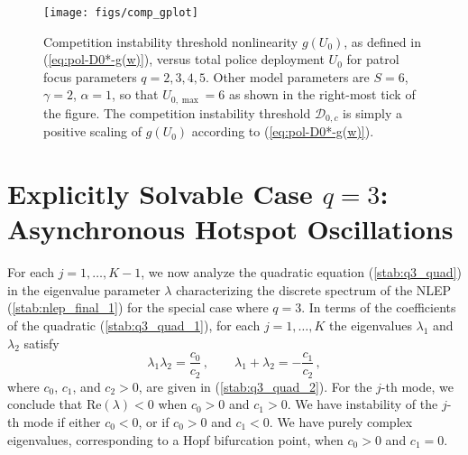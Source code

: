 \documentclass{article}%
\begin{document}
\begin{figure}[htbp]
\centering
\texttt{[image: figs/comp\_gplot]}
\caption{\label{fig:gU0-vs-U0}Competition instability threshold
  nonlinearity $g(U_{0})$, as defined in (\ref{eq:pol-D0*-g(w)}), versus
  total police deployment $U_{0}$ for patrol focus parameters
  $q=2,3,4,5$. Other model parameters are $S=6$, $\gamma=2$, $\alpha=1$, so
  that $U_{0,\max}=6$ as shown in the right-most tick of the figure.
  The competition instability threshold ${\mathcal D}_{0,c}$ is
  simply a positive scaling of $g(U_{0})$ according to
  (\ref{eq:pol-D0*-g(w)}).}
\end{figure}

\setcounter{equation}{0}
\setcounter{section}{4}
\section{Explicitly Solvable Case $q=3$: Asynchronous Hotspot Oscillations}
\label{sec:stab_q3}

For each $j=1,\ldots,K-1$, we now analyze the quadratic equation
(\ref{stab:q3_quad}) in the eigenvalue parameter $\lambda$
characterizing the discrete spectrum of the NLEP
(\ref{stab:nlep_final_1}) for the special case where $q=3$. In terms
of the coefficients of the quadratic (\ref{stab:q3_quad_1}), for each
$j=1,\ldots,K$ the eigenvalues $\lambda_1$ and $\lambda_2$ satisfy
\begin{equation}\label{q3:lam12}
   \lambda_1 \lambda_2 = \frac{c_0}{c_2} \,, \qquad
  \lambda_1 + \lambda_2 = - \frac{c_1}{c_2} \,,
\end{equation}
where $c_0$, $c_1$, and $c_2>0$, are given in (\ref{stab:q3_quad_2}). For
the $j$-th mode, we conclude that $\mbox{Re}(\lambda)<0$ when $c_0>0$
and $c_1>0$. We have instability of the $j$-th mode if either
$c_0<0$, or if $c_0>0$ and $c_1<0$. We have purely complex eigenvalues,
corresponding to a Hopf bifurcation point, when $c_0>0$ and $c_1=0$.
\end{document}

